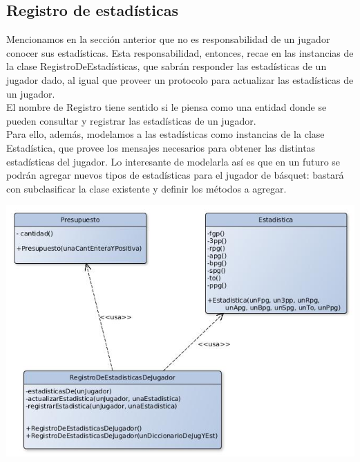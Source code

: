 \subsection{Registro de estadísticas}
Mencionamos en la sección anterior que no es responsabilidad de un jugador conocer sus estadísticas. Esta responsabilidad, entonces, recae en las instancias de la clase RegistroDeEstadísticas, que sabrán responder las estadísticas de un jugador dado, al igual que proveer un protocolo para actualizar las estadísticas de un jugador.\\
El nombre de Registro tiene sentido si le piensa como una entidad donde se pueden consultar y registrar las estadísticas de un jugador.\\
Para ello, además, modelamos a las estadísticas como instancias de la clase Estadística, que provee los mensajes necesarios para obtener las distintas estadísticas del jugador. Lo interesante de modelarla así es que en un futuro se podrán agregar nuevos tipos de estadísticas para el jugador de básquet: bastará con subclasificar la clase existente y definir los métodos a agregar.\\
\begin{center}
\includegraphics[scale=0.4]{diseno/registroDeEstadisticas.jpg}
\end{center}



